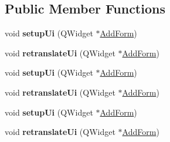 \subsection*{Public Member Functions}
\begin{DoxyCompactItemize}
\item 
void {\bfseries setup\+Ui} (Q\+Widget $\ast$\hyperlink{class_add_form}{Add\+Form})\hypertarget{class_ui___add_form_af455ce00340387a301d9f86838f66ee4}{}\label{class_ui___add_form_af455ce00340387a301d9f86838f66ee4}

\item 
void {\bfseries retranslate\+Ui} (Q\+Widget $\ast$\hyperlink{class_add_form}{Add\+Form})\hypertarget{class_ui___add_form_a302a63c74c7a1d7270d1ed0c457e933a}{}\label{class_ui___add_form_a302a63c74c7a1d7270d1ed0c457e933a}

\item 
void {\bfseries setup\+Ui} (Q\+Widget $\ast$\hyperlink{class_add_form}{Add\+Form})\hypertarget{class_ui___add_form_af455ce00340387a301d9f86838f66ee4}{}\label{class_ui___add_form_af455ce00340387a301d9f86838f66ee4}

\item 
void {\bfseries retranslate\+Ui} (Q\+Widget $\ast$\hyperlink{class_add_form}{Add\+Form})\hypertarget{class_ui___add_form_a302a63c74c7a1d7270d1ed0c457e933a}{}\label{class_ui___add_form_a302a63c74c7a1d7270d1ed0c457e933a}

\item 
void {\bfseries setup\+Ui} (Q\+Widget $\ast$\hyperlink{class_add_form}{Add\+Form})\hypertarget{class_ui___add_form_af455ce00340387a301d9f86838f66ee4}{}\label{class_ui___add_form_af455ce00340387a301d9f86838f66ee4}

\item 
void {\bfseries retranslate\+Ui} (Q\+Widget $\ast$\hyperlink{class_add_form}{Add\+Form})\hypertarget{class_ui___add_form_a302a63c74c7a1d7270d1ed0c457e933a}{}\label{class_ui___add_form_a302a63c74c7a1d7270d1ed0c457e933a}

\end{DoxyCompactItemize}
